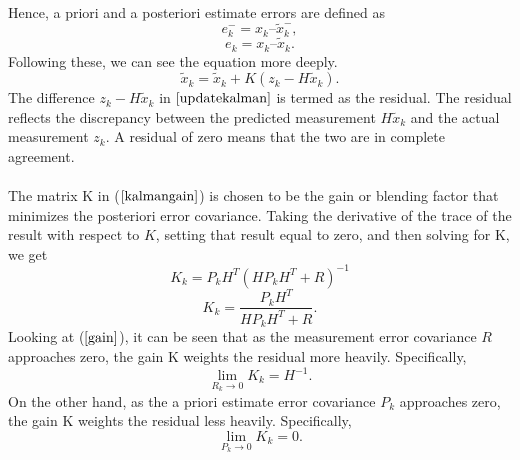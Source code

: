 \documentclass[a4paper,10pt]{report}
\begin{document}
\paragraph*{}
Hence, a priori and a posteriori estimate errors are defined as
\begin{equation}
e_k^- = x_k – \tilde x_k^- ,
\end{equation}
\begin{equation}
e_k =  x_k – \tilde x_k.
\end{equation}
Following these, we can see the equation more deeply.
\begin{equation}
\tilde x_k = \tilde x_k + K(z_k-H\tilde x_k).
\label{updatekalman}
\end{equation}
The difference $z_k - H\tilde x_k$ in $\ref{updatekalman}$ is termed as the residual. The residual reflects the discrepancy between the predicted measurement $H\tilde x_k$ and the actual measurement $z_k$. A residual of zero means that the two are in complete
agreement. \paragraph*{}
The matrix K in ($\ref{kalmangain}$) is chosen to be the gain or blending factor that minimizes the posteriori error covariance. Taking the derivative of the trace of the result with respect to $K$, setting that result equal to zero, and then solving for K, we get
\begin{equation}
K_k = P_kH^{T}(HP_kH^{T} + R)^{-1}
\end{equation}
\begin{equation}
K_k = \frac{P_kH^T}{HP_kH^T + R}.
\label{gain}
\end{equation}
Looking at ($\ref{gain}$), it can be seen that as the measurement error covariance $R$ approaches zero, the gain K weights the residual more
heavily. Specifically,
\begin{equation}
\mathop {\lim }\limits_{R_k \to 0 } {K_k} = H^{-1}.
\end{equation}
On the other hand, as the a priori estimate error covariance $P_k$ approaches zero, the gain K weights the residual less heavily. Specifically,
\begin{equation}
\mathop {\lim }\limits_{P_k \to 0 } {K_k} = 0.
\end{equation}
\end{document}
